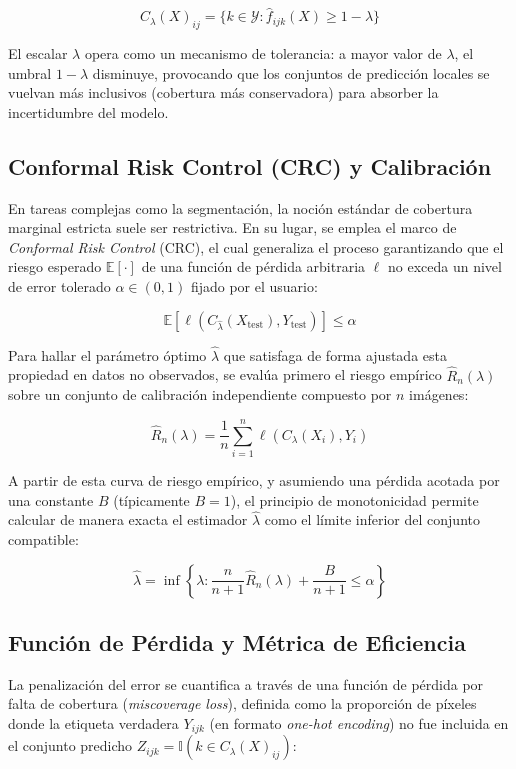 \begin{equation}
C_\lambda(X)_{ij} = \{ k \in \mathcal{Y} : \hat{f}_{ijk}(X) \geq 1 - \lambda \}
\end{equation}

El escalar $\lambda$ opera como un mecanismo de tolerancia: a mayor valor de $\lambda$, el umbral $1-\lambda$ disminuye, provocando que los conjuntos de predicción locales se vuelvan más inclusivos (cobertura más conservadora) para absorber la incertidumbre del modelo.

\subsection{Conformal Risk Control (CRC) y Calibración}
En tareas complejas como la segmentación, la noción estándar de cobertura marginal estricta suele ser restrictiva. En su lugar, se emplea el marco de \textit{Conformal Risk Control} (CRC), el cual generaliza el proceso garantizando que el riesgo esperado $\mathbb{E}[\cdot]$ de una función de pérdida arbitraria $\ell$ no exceda un nivel de error tolerado $\alpha \in (0,1)$ fijado por el usuario:

\begin{equation}
\mathbb{E}[ \ell(C_{\hat{\lambda}}(X_{\text{test}}), Y_{\text{test}}) ] \leq \alpha
\end{equation}

Para hallar el parámetro óptimo $\hat{\lambda}$ que satisfaga de forma ajustada esta propiedad en datos no observados, se evalúa primero el riesgo empírico $\hat{R}_n(\lambda)$ sobre un conjunto de calibración independiente compuesto por $n$ imágenes:

\begin{equation}
\hat{R}_n(\lambda) = \frac{1}{n} \sum_{i=1}^n \ell(C_\lambda(X_i), Y_i)
\end{equation}

A partir de esta curva de riesgo empírico, y asumiendo una pérdida acotada por una constante $B$ (típicamente $B=1$), el principio de monotonicidad permite calcular de manera exacta el estimador $\hat{\lambda}$ como el límite inferior del conjunto compatible:

\begin{equation}
\hat{\lambda}
=
\inf \left \{ \lambda : \frac{n}{n+1} \hat{R}_n(\lambda) + \frac{B}{n+1} \leq \alpha \right \}
\end{equation}

\subsection{Función de Pérdida y Métrica de Eficiencia}
La penalización del error se cuantifica a través de una función de pérdida por falta de cobertura (\textit{miscoverage loss}), definida como la proporción de píxeles donde la etiqueta verdadera $Y_{ijk}$ (en formato \textit{one-hot encoding}) no fue incluida en el conjunto predicho $Z_{ijk} = \mathbb{I}(k \in C_\lambda(X)_{ij})$:

